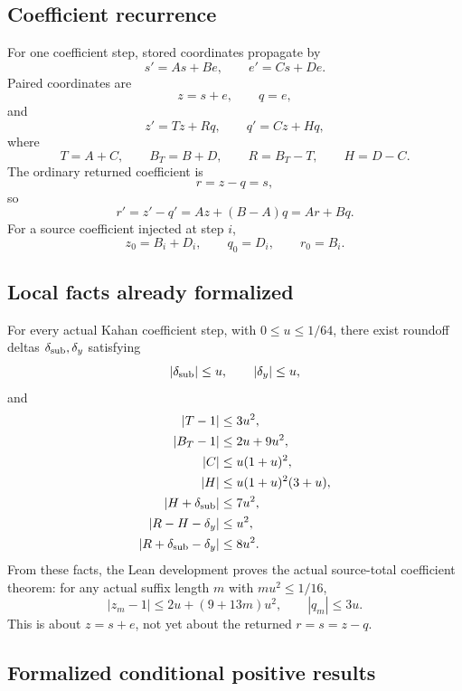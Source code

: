 \documentclass{article}
\begin{document}
\subsection*{Coefficient recurrence}

For one coefficient step, stored coordinates propagate by
\[
  s' = A s + B e,\qquad e' = C s + D e.
\]
Paired coordinates are
\[
  z=s+e,\qquad q=e,
\]
and
\[
  z'=Tz+Rq,\qquad q'=Cz+Hq,
\]
where
\[
  T=A+C,\qquad B_T=B+D,\qquad R=B_T-T,\qquad H=D-C.
\]
The ordinary returned coefficient is
\[
  r=z-q=s,
\]
so
\[
  r'=z'-q'=A z+(B-A)q=A r+Bq.
\]
For a source coefficient injected at step \(i\),
\[
  z_0=B_i+D_i,\qquad q_0=D_i,\qquad r_0=B_i.
\]

\subsection*{Local facts already formalized}

For every actual Kahan coefficient step, with \(0\le u\le 1/64\), there exist
roundoff deltas \(\delta_{\rm sub},\delta_y\) satisfying
\[
  |\delta_{\rm sub}|\le u,\qquad |\delta_y|\le u,
\]
and
\[
\begin{aligned}
  |T-1| &\le 3u^2,\\
  |B_T-1| &\le 2u+9u^2,\\
  |C| &\le u(1+u)^2,\\
  |H| &\le u(1+u)^2(3+u),\\
  |H+\delta_{\rm sub}| &\le 7u^2,\\
  |R-H-\delta_y| &\le u^2,\\
  |R+\delta_{\rm sub}-\delta_y| &\le 8u^2.
\end{aligned}
\]
From these facts, the Lean development proves the actual source-total
coefficient theorem:
for any actual suffix length \(m\) with \(m u^2\le 1/16\),
\[
  |z_m-1|\le 2u+(9+13m)u^2,\qquad |q_m|\le 3u.
\]
This is about \(z=s+e\), not yet about the returned \(r=s=z-q\).

\subsection*{Formalized conditional positive results}
\end{document}
